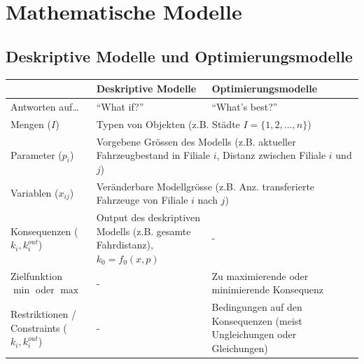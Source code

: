 \section{Mathematische Modelle }
\subsection{Deskriptive Modelle und Optimierungsmodelle }
  \begin{tabular}{|p{3.7cm}|p{7cm}|p{7cm}|}
    \hline
    & \textbf{Deskriptive Modelle}
    & \textbf{Optimierungsmodelle} \\
    \hline
    \hline
    Antworten auf\ldots
      & ``What if?''
      & ``What's best?'' \\
    \hline
    Mengen ($I$)
      & \multicolumn{2}{l|}{Typen von Objekten (z.B. Städte $I = \{1,2,\ldots,n\}$)} \\
    \hline
    Parameter ($p_i$)
      & \multicolumn{2}{p{14cm}|}{Vorgebene Grössen des Modells (z.B. aktueller Fahrzeugbestand in Filiale $i$, Distanz zwischen Filiale $i$ und $j$)} \\
    \hline
    Variablen ($x_{ij}$)
      & \multicolumn{2}{l|}{Veränderbare Modellgrösse (z.B. Anz. transferierte Fahrzeuge von Filiale $i$ nach $j$)} \\
    \hline
    Konsequenzen ($k_{i}, k_i^{out}$)
      & Output des deskriptiven Modells (z.B. gesamte Fahrdistanz), $k_0 = f_0(x,p)$ 
      & -\\
    \hline
    Zielfunktion $\min$ oder $\max$
      & - 
      & Zu maximierende oder minimierende Konsequenz\\
    \hline
    Restriktionen / Constraints ($k_{i}, k_i^{out}$)
      & - 
      & Bedingungen auf den Konsequenzen (meist Ungleichungen oder Gleichungen)\\
    \hline
  \end{tabular}
  
